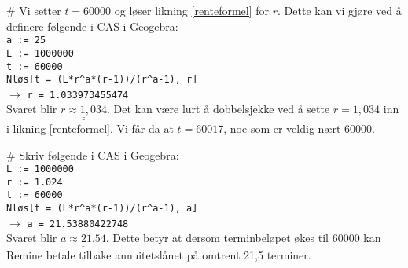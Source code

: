 \documentclass[12pt, a4paper]
{article}						%
\def\answer#1{\underline{\underline{#1}}}
\begin{document}
\begin{easylist}[enumerate]
		# Vi setter $t = 60000$ og løser likning \eqref{renteformel} for $r$.
		Dette kan vi gjøre ved å definere følgende i CAS i Geogebra: \\
		\texttt{a  := 25} \\
		\texttt{L := 1000000} \\
		\texttt{t := 60000} \\
		\texttt{Nløs[t = (L*r\textasciicircum a*(r-1))/(r\textasciicircum a-1), r]} \\
		$\rightarrow$ \texttt{r = 1.033973455474} \\
		Svaret blir $\answer{r \approx 1,034}$.
		Det kan være lurt å dobbelsjekke ved å sette $r = 1,034$ inn i likning \eqref{renteformel}. Vi får da at $t = 60017$, noe som er veldig nært 60000.
		
		# Skriv følgende i CAS i Geogebra: \\
		\texttt{L := 1000000} \\
		\texttt{r := 1.024} \\
		\texttt{t := 60000} \\
		\texttt{Nløs[t = (L*r\textasciicircum a*(r-1))/(r\textasciicircum a-1), a]} \\
		$\rightarrow$ \texttt{a = 21.53880422748} \\
		Svaret blir $\answer{a \approx 21.54}$. Dette betyr at dersom terminbeløpet økes til 60000 kan Remine betale tilbake annuitetslånet på omtrent 21,5 terminer.
	\end{easylist}
	
	
\end{document}
